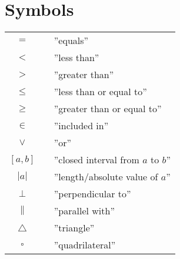 



\section*{Symbols} \label{Symbol}
\renewcommand{\arraystretch}{1.2}
\begin{tabular}{@{}cp{0.4cm}l}
$ = $ && ''equals'' \\
$ < $ && ''less than'' \\
$ > $ && ''greater than'' \\
$ \leq $ && ''less than or equal to'' \\
$ \geq $ && ''greater than or equal to'' \\		
$ \in $ && ''included in'' \\
$ \vee $&&''or''\\
$ [a, b] $ && ''closed interval from $ a $ to $ b $''\\
$|a| $ &&  ''length/absolute value of $ a $''\\
$\perp $ &&  ''perpendicular to'' \\
$\parallel $ &&  ''parallel with'' \\
$\triangle $ &&  ''triangle'' \\
$\square $ &&  ''quadrilateral'' \\
\end{tabular}
\renewcommand{\arraystretch}{1}

